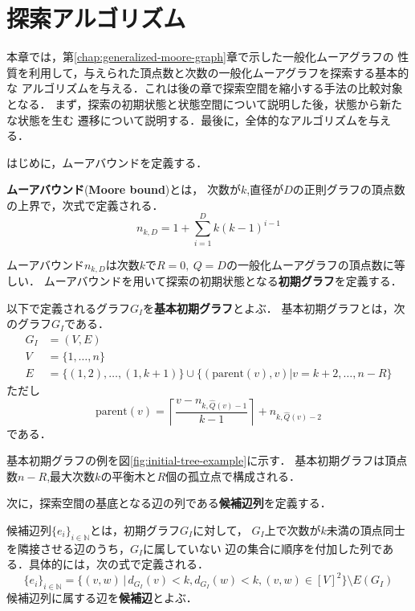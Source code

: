 
\chapter{探索アルゴリズム}
\label{chap:basic-algorithm}
本章では，第\ref{chap:generalized-moore-graph}章で示した一般化ムーアグラフの
性質を利用して，与えられた頂点数と次数の一般化ムーアグラフを探索する基本的な
アルゴリズムを与える．これは後の章で探索空間を縮小する手法の比較対象となる．
まず，探索の初期状態と状態空間について説明した後，状態から新たな状態を生む
遷移について説明する．最後に，全体的なアルゴリズムを与える．

はじめに，ムーアバウンドを定義する．
\begin{definition}\rm
  \textbf{ムーアバウンド}(\textbf{Moore bound})とは，
  次数が$k$,直径が$D$の正則グラフの頂点数の上界で，次式で定義される．
  \begin{equation}
    n_{k,D} = 1 + \sum_{i=1}^Dk(k-1)^{i-1}
  \end{equation}
\end{definition}

ムーアバウンド$n_{k,D}$は次数$k$で$R=0,\ Q=D$の一般化ムーアグラフの頂点数に等しい．
ムーアバウンドを用いて探索の初期状態となる\textbf{初期グラフ}を定義する．

\begin{definition}\rm
  \label{def:basic-initial-graph}
  以下で定義されるグラフ$G_I$を\textbf{基本初期グラフ}とよぶ．
  基本初期グラフとは，次のグラフ$G_I$である．
  \begin{equation}
    \begin{aligned}
      \label{eq:basic-initial-graph}
      G_I&=(V,E) \\
      V&=\{1,\ldots,n\} \\
      E&=\{(1,2),\ldots,(1,k+1)\}\cup
      \{(\text{parent}(v),v)|v=k+2,\ldots,n-R\}
    \end{aligned}
  \end{equation}
  ただし
  \[\text{parent}(v)=
  \left\lceil\frac{v-n_{k,\hat{Q}(v)-1}}{k-1}\right\rceil+n_{k,\hat{Q}(v)-2}\]
  である．
\end{definition}

基本初期グラフの例を図\ref{fig:initial-tree-example}に示す．
基本初期グラフは頂点数$n-R$,最大次数$k$の平衡木と$R$個の孤立点で構成される．

次に，探索空間の基底となる辺の列である\textbf{候補辺列}を定義する．

\begin{definition}\rm
  \label{def:candidate-edges}
  候補辺列$\{e_i\}_{i\in\mathbb{N}}$とは，初期グラフ$G_I$に対して，
  $G_I$上で次数が$k$未満の頂点同士を隣接させる辺のうち，$G_I$に属していない
  辺の集合に順序を付加した列である．具体的には，次の式で定義される．
  \begin{equation}
    \{e_i\}_{i\in\mathbb{N}} =
    \{(v,w)\,|\,d_{G_I}(v)<k,d_{G_I}(w)<k,(v,w)\in[V]^2\}\setminus E(G_I)
  \end{equation}
  候補辺列に属する辺を\textbf{候補辺}とよぶ．
\end{definition}

